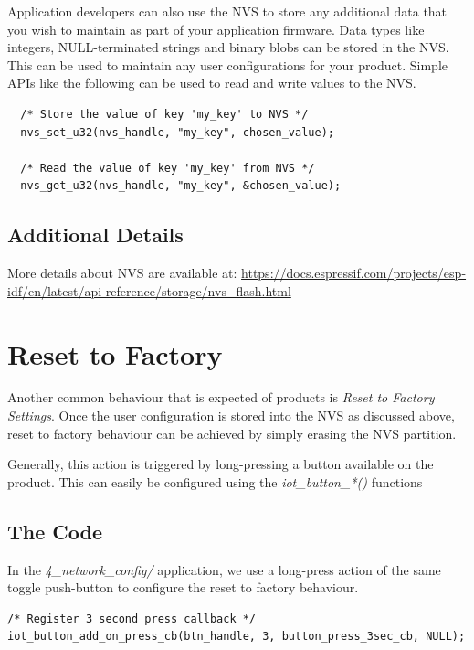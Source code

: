 \documentclass[main.tex]{subfiles}
\begin{document}
Application developers can also use the NVS to store any additional data that you wish to maintain as part of your application firmware. Data types like integers, NULL-terminated strings and binary blobs can be stored in the NVS. This can be used to maintain any user configurations for your product. Simple APIs like the following can be used to read and write values to the NVS.

\begin{verbatim}
  /* Store the value of key 'my_key' to NVS */
  nvs_set_u32(nvs_handle, "my_key", chosen_value);

  /* Read the value of key 'my_key' from NVS */
  nvs_get_u32(nvs_handle, "my_key", &chosen_value);
\end{verbatim}


\subsection{Additional Details}

More details about NVS are available at: \url{https://docs.espressif.com/projects/esp-idf/en/latest/api-reference/storage/nvs_flash.html}

\section{Reset to Factory}
Another common behaviour that is expected of products is \textit{Reset to Factory Settings}. Once the user configuration is stored into the NVS as discussed above, reset to factory behaviour can be achieved by simply erasing the NVS partition.

Generally, this action is triggered by long-pressing a button available on the product. This can easily be configured using the \textit{iot\_button\_*()} functions

\subsection{The Code}\label{sec:reset_to_factory}
In the \textit{4\_network\_config/} application, we use a long-press action of the same toggle push-button to configure the reset to factory behaviour.

\begin{verbatim}
/* Register 3 second press callback */  
iot_button_add_on_press_cb(btn_handle, 3, button_press_3sec_cb, NULL);
\end{verbatim}
\end{document}
